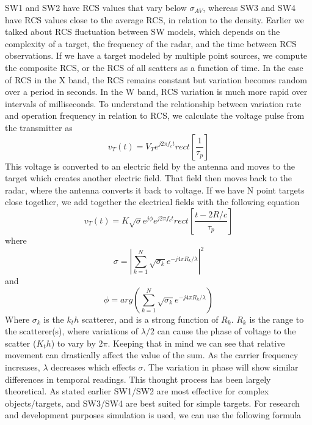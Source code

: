 \documentclass[12pt]{article}
\begin{document}
SW1 and SW2 have RCS values that vary below $\sigma_{AV}$, whereas SW3 and SW4 have RCS values close to the average RCS, in relation to the density. Earlier we talked about RCS fluctuation between SW models, which depends on the complexity of a target, the frequency of the radar, and the time between RCS observations. If we have a target modeled by multiple point sources, we compute the composite RCS, or the RCS of all scatters as a function of time. In the case of RCS in the X band, the RCS remains constant but variation becomes random over a period in seconds. In the W band, RCS variation is much more rapid over intervals of milliseconds. 
To understand the relationship between variation rate and operation frequency in relation to RCS, we calculate the voltage pulse from the transmitter as
\begin{equation}
    v_T(t) = V_T e^{j2\pi f_c t} rect \left[ \frac{1}{\tau_p} \right]
\end{equation}
This voltage is converted to an electric field by the antenna and moves to the target which creates another electric field. That field then moves back to the radar, where the antenna converts it back to voltage. If we have N point targets close together, we add together the electrical fields with the following equation
\begin{equation}
    v_T(t) = K \sqrt{\sigma} e^{j \phi} e^{j2\pi f_c t} rect \left[ \frac{t-2R/c}{\tau_p} \right]
\end{equation}
where
\begin{equation}
    \sigma = \left| \sum_{k=1}^{N} \sqrt{\sigma_k} e^{-j4 \pi R_k / \lambda }  \right| ^ 2
\end{equation}
and 
\begin{equation}
    \phi = arg \left( \sum_{k=1}^{N} \sqrt{\sigma_k} e^{-j4 \pi R_k / \lambda} \right)
\end{equation}
Where $\sigma_k$ is the $k_th$ scatterer, and is a strong function of $R_k$. $R_k$ is the range to the scatterer(s), where variations of $\lambda/2$ can cause the phase of voltage to the scatter ($K_th$) to vary by $2 \pi$. Keeping that in mind we can see that relative movement can drastically affect the value of the sum. As the carrier frequency increases, $\lambda$ decreases which effects $\sigma$. The variation in phase will show similar differences in temporal readings. This thought process has been largely theoretical. As stated earlier SW1/SW2 are most effective for complex objects/targets, and SW3/SW4 are best suited for simple targets. For research and development purposes simulation is used, we can use the following formula
\end{document}

